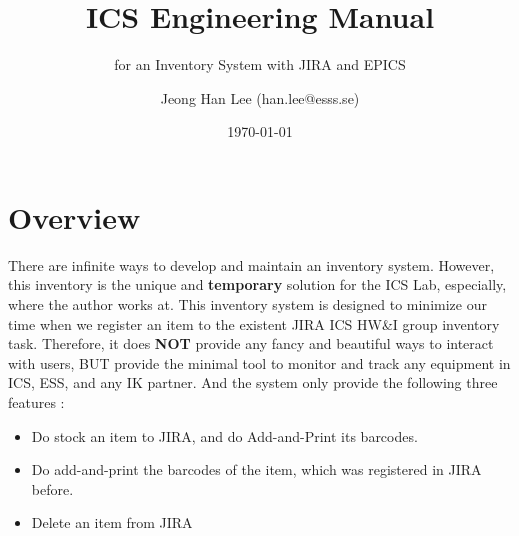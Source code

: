 \documentclass[11pt
  , a4paper
  , article
  , oneside
  , showtrims
]{memoir}
\begin{document}


\date{\today}




\title{ICS Engineering Manual}
\subtitle{for an Inventory System with JIRA and EPICS}
\author{Jeong Han Lee (han.lee@esss.se)}



\showtrimson

\esstitle
\newpage
\tableofcontents
\newpage



\chapter{Overview}
There are infinite ways to develop and maintain an inventory system. However, this inventory is the unique and \textbf{temporary} solution for the ICS Lab, especially, where the author works at. This inventory system is designed to minimize our time when we register an item to the existent JIRA ICS HW\&I group inventory task.  Therefore, it does \textbf{NOT} provide any fancy and beautiful ways to interact with users, BUT provide the minimal tool to monitor and track any equipment in ICS, ESS, and any IK partner. And the system only provide the following three features :
\begin{itemize}
\item Do stock an item to JIRA, and do Add-and-Print its barcodes.
\item Do add-and-print the barcodes of the item, which was registered in JIRA before.
\item Delete an item from JIRA
\end{itemize}
\end{document}
